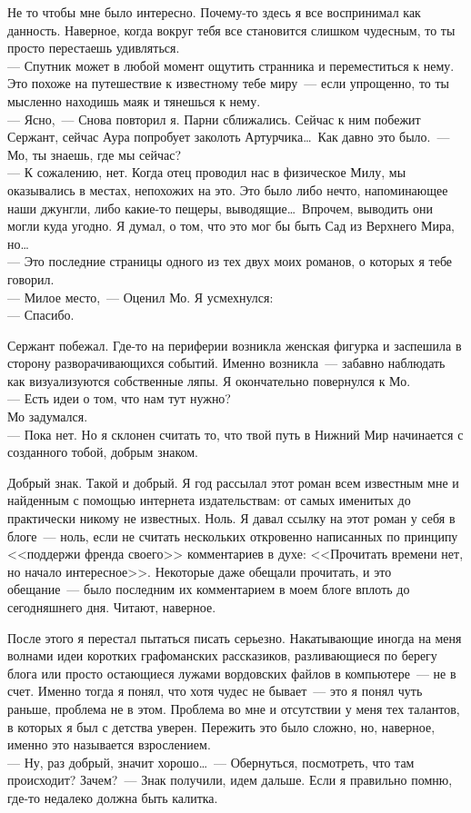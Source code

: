 Не то чтобы мне было интересно. Почему-то здесь я все воспринимал как данность. 
Наверное, когда вокруг тебя все становится слишком чудесным, то ты просто 
перестаешь удивляться.\\
--- Спутник может в любой момент ощутить странника и переместиться к нему. Это 
похоже на путешествие к известному тебе миру~--- если упрощенно, то ты мысленно 
находишь маяк и тянешься к нему. \\
--- Ясно,~--- Снова повторил я. Парни сближались. Сейчас к ним побежит Сержант, 
сейчас Аура попробует заколоть Артурчика\ldots\ Как давно это было.~--- Мо, ты 
знаешь, где мы сейчас?\\
--- К сожалению, нет. Когда отец проводил нас в физическое Милу, мы оказывались в 
местах, непохожих на это. Это было либо нечто, напоминающее наши джунгли, либо 
какие-то пещеры, выводящие\ldots\ Впрочем, выводить они могли куда угодно. Я 
думал, о том, что это мог бы быть Сад из Верхнего Мира, но\ldots\\
--- Это последние страницы одного из тех двух моих романов, о которых я тебе 
говорил.\\
--- Милое место,~--- Оценил Мо. Я усмехнулся:\\
--- Спасибо. 

Сержант побежал. Где-то на периферии возникла женская фигурка и заспешила в 
сторону разворачивающихся событий. Именно возникла~--- забавно наблюдать как 
визуализуются собственные ляпы. Я окончательно повернулся к Мо.\\
--- Есть идеи о том, что нам тут нужно?\\
Мо задумался.\\
--- Пока нет. Но я склонен считать то, что твой путь в Нижний Мир начинается с 
созданного тобой, добрым знаком.

Добрый знак. Такой и добрый. Я год рассылал этот роман всем известным мне и 
найденным с помощью интернета издательствам: от самых именитых до практически 
никому не известных. Ноль. Я давал ссылку на этот роман у себя в блоге~--- 
ноль, если не считать нескольких откровенно написанных по принципу <<поддержи френда 
своего>> комментариев в духе: <<Прочитать времени нет, но начало интересное>>. 
Некоторые даже обещали прочитать, и это обещание~--- было последним их 
комментарием в моем блоге вплоть до сегодняшнего дня. Читают, наверное.

После этого я перестал пытаться писать серьезно. Накатывающие иногда на меня 
волнами идеи коротких графоманских рассказиков, разливающиеся по берегу блога 
или просто остающиеся лужами вордовских файлов в компьютере~--- не в счет. 
Именно тогда я понял, что хотя чудес не бывает~--- это я понял чуть раньше, проблема 
не в этом. Проблема во мне и отсутствии у меня тех талантов, в которых я был с 
детства уверен. Пережить это было сложно, но, наверное, именно это называется 
взрослением.\\
--- Ну, раз добрый, значит хорошо\ldots~--- Обернуться, посмотреть, что там 
происходит? Зачем?~--- Знак получили, идем дальше. Если я правильно помню, где-то недалеко 
должна быть калитка.

